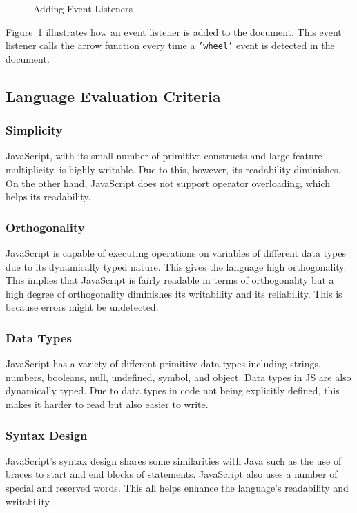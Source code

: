 \documentclass{article}
\newcommand{\js}[1]{\inputminted{javascript}{samples/js/#1.js}}
\newcommand{\jsin}[1]{\texttt{#1}}
\begin{document}
  \begin{figure}[ht]
    \js{events}
    \caption{Adding Event Listeners}
    \label{fig:events}
  \end{figure}

  Figure~\ref{fig:events} illustrates how an event listener is added to the
  document. This event listener calls the arrow function every time a
  \jsin{'wheel'} event is detected in the document.


  \subsection{Language Evaluation Criteria}

  \subsubsection{Simplicity}
  JavaScript, with its small number of primitive constructs and large feature
  multiplicity, is highly writable. Due to this, however, its readability diminishes.
  On the other hand, JavaScript does not support operator overloading, which
  helps its readability.

  \subsubsection{Orthogonality}
  JavaScript is capable of executing operations on variables of different data
  types due to its dynamically typed nature. This gives the language high
  orthogonality. This implies that JavaScript is fairly readable in terms of
  orthogonality but a high degree of orthogonality diminishes its writability
  and its reliability. This is because errors might be undetected.

  \subsubsection{Data Types}
  JavaScript has a variety of different primitive data types including strings,
  numbers, booleans, null, undefined, symbol, and object. Data types in JS are
  also dynamically typed. Due to data types in code not being explicitly defined,
  this makes it harder to read but also easier to write.

  \subsubsection{Syntax Design}
  JavaScript’s syntax design shares some similarities with Java such as the use
  of braces to start and end blocks of statements. JavaScript also uses a number
  of special and reserved words. This all helps enhance the language’s
  readability and writability.
\end{document}
